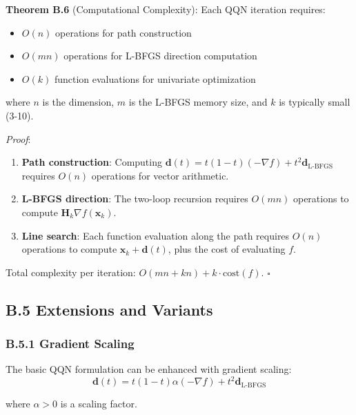 \textbf{Theorem B.6} (Computational Complexity): Each QQN iteration requires:

\begin{itemize}
\tightlist
\item
  \(O(n)\) operations for path construction
\item
  \(O(mn)\) operations for L-BFGS direction computation
\item
  \(O(k)\) function evaluations for univariate optimization
\end{itemize}

where \(n\) is the dimension, \(m\) is the L-BFGS memory size, and \(k\) is typically small (3-10).

\emph{Proof}:

\begin{enumerate}
\def\labelenumi{\arabic{enumi}.}
\tightlist
\item
  \textbf{Path construction}: Computing \(\mathbf{d}(t) = t(1-t)(-\nabla f) + t^2 \mathbf{d}_{\text{L-BFGS}}\) requires \(O(n)\) operations for vector arithmetic.
\item
  \textbf{L-BFGS direction}: The two-loop recursion requires \(O(mn)\) operations to compute \(\mathbf{H}_k\nabla f(\mathbf{x}_k)\).
\item
  \textbf{Line search}: Each function evaluation along the path requires \(O(n)\) operations to compute \(\mathbf{x}_k + \mathbf{d}(t)\), plus the cost of evaluating \(f\).
\end{enumerate}

Total complexity per iteration: \(O(mn + kn) + k \cdot \text{cost}(f)\). \(\square\)

\hypertarget{b.5-extensions-and-variants}{%
\subsection{B.5 Extensions and Variants}\label{b.5-extensions-and-variants}}

\hypertarget{b.5.1-gradient-scaling}{%
\subsubsection{B.5.1 Gradient Scaling}\label{b.5.1-gradient-scaling}}

The basic QQN formulation can be enhanced with gradient scaling:
\[\mathbf{d}(t) = t(1-t)\alpha(-\nabla f) + t^2 \mathbf{d}_{\text{L-BFGS}}\]

where \(\alpha > 0\) is a scaling factor.

